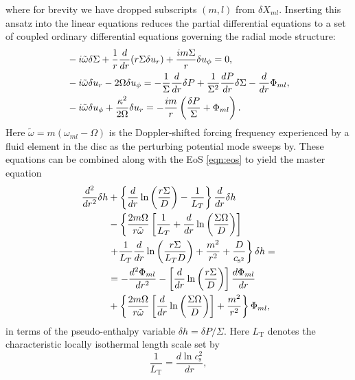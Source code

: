 %
where for brevity we have dropped subscripts $(m,l)$ from $\delta X_{ml}$. Inserting this ansatz into the linear equations reduces the partial differential equations to a set of coupled ordinary differential equations governing the radial mode structure:
%
\begin{align}
\label{eq:density_pert_eqn}
&    -i \Tilde{\omega}\delta \Sigma + \frac{1}{r}\frac{d}{d r}(r\Sigma \delta u_r)+\frac{i m \Sigma}{r}\delta u_\phi = 0 , 
    \\
\label{eq:ur_eqn}
&    -i \Tilde{\omega}\delta u_r - 2\Omega \delta u_{\phi} = -\frac{1}{\Sigma}\frac{d}{d r} \delta P +\frac{1}{\Sigma^2}\frac{dP}{dr}\delta \Sigma-\frac{d}{d r}\Phi_{ml},
    \\
\label{eq:uphi_eqn}
& -i \Tilde{\omega}\delta u_\phi + \frac{\kappa^2}{2\Omega}\delta u_r = -\frac{i m}{r}\left( \frac{\delta P}{\Sigma}+\Phi_{ml}\right).
\end{align}
%
Here $\tilde{\omega} = m(\omega_{ml}-\Omega)$ is the Doppler-shifted forcing frequency experienced by a fluid element in the disc as the perturbing potential mode sweeps by. These equations can be combined along with the EoS \eqref{eqn:eos} to yield the master equation
%
\begin{align}
\label{eq:master_eqn}
     \frac{d^2}{dr^2}\delta h & +\left\{ \frac{d}{dr}\ln\left(\frac{r\Sigma}{D}\right)-\frac{1}{L_T} \right\} \frac{d}{dr}\delta h \nonumber \\
    & - \left\{ \frac{2m\Omega}{r\Tilde{\omega}}\left[\frac{1}{L_T}+\frac{d}{dr}\ln\left(\frac{\Sigma \Omega}{D}\right)\right] \right. \nonumber \\
    & \left.+\frac{1}{L_T}\frac{d}{dr}\ln\left(\frac{r\Sigma}{L_T D}\right)+\frac{m^2}{r^2}+\frac{D}{c_{\textrm{s}^2}}\right\} \delta h = \nonumber \\
    & = -\frac{d^2 \Phi_{ml}}{dr^2} - \left[ \frac{d}{dr}\ln\left(\frac{r\Sigma}{D}\right)\right]\frac{d\Phi_{ml}}{dr} \nonumber \\
    & + \left\{\frac{2m\Omega}{r\Tilde{\omega}}\left[\frac{d}{dr}\ln\left(\frac{\Sigma \Omega}{D}\right)\right]+\frac{m^2}{r^2}\right\}\Phi_{ml},
\end{align}
%
in terms of the pseudo-enthalpy variable $\delta h = \delta P/\Sigma$. Here $L_\textrm{T}$ denotes the characteristic locally isothermal length scale set by
%
\begin{equation}
    \label{eqn:thermal_scale}
    \frac{1}{L_\textrm{T}} = \frac{d \ln c_\textrm{s}^2}{dr} ,
\end{equation}
